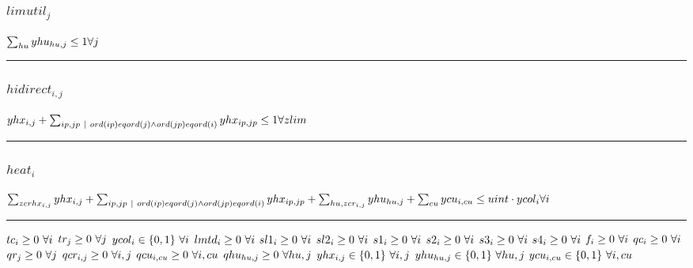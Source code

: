 \documentclass[11pt]{article}
\begin{document}
\subsubsection*{$limutil_{j}$}
$
\sum_{hu} yhu_{hu,j} \leq 1\hfill \forall j
$
\vspace{5pt}
\hrule
\subsubsection*{$hidirect_{i,j}$}
$
yhx_{i,j} + \sum_{ip,jp ~ | ~ ord(ip) eq ord(j) \wedge ord(jp) eq ord(i)} yhx_{ip,jp} \leq 1\hfill \forall zlim
$
\vspace{5pt}
\hrule
\subsubsection*{$heat_{i}$}
$
\sum_{zcrhx_{i,j}} yhx_{i,j} + \sum_{ip,jp ~ | ~ ord(ip) eq ord(j) \wedge ord(jp) eq ord(i)} yhx_{ip,jp} + \sum_{hu,zcr_{i,j}} yhu_{hu,j} + \sum_{cu} ycu_{i,cu} \leq uint \cdot ycol_{i}\hfill \forall i
$
\vspace{5pt}
\hrule
\bigskip
$tc_{i}\geq 0 ~ \forall i\\$
$tr_{j}\geq 0 ~ \forall j\\$
$ycol_{i}\in \{0,1\} ~ \forall i\\$
$lmtd_{i}\geq 0 ~ \forall i\\$
$sl1_{i}\geq 0 ~ \forall i\\$
$sl2_{i}\geq 0 ~ \forall i\\$
$s1_{i}\geq 0 ~ \forall i\\$
$s2_{i}\geq 0 ~ \forall i\\$
$s3_{i}\geq 0 ~ \forall i\\$
$s4_{i}\geq 0 ~ \forall i\\$
$f_{i}\geq 0 ~ \forall i\\$
$qc_{i}\geq 0 ~ \forall i\\$
$qr_{j}\geq 0 ~ \forall j\\$
$qcr_{i,j}\geq 0 ~ \forall i,j\\$
$qcu_{i,cu}\geq 0 ~ \forall i,cu\\$
$qhu_{hu,j}\geq 0 ~ \forall hu,j\\$
$yhx_{i,j}\in \{0,1\} ~ \forall i,j\\$
$yhu_{hu,j}\in \{0,1\} ~ \forall hu,j\\$
$ycu_{i,cu}\in \{0,1\} ~ \forall i,cu\\$
\end{document}
